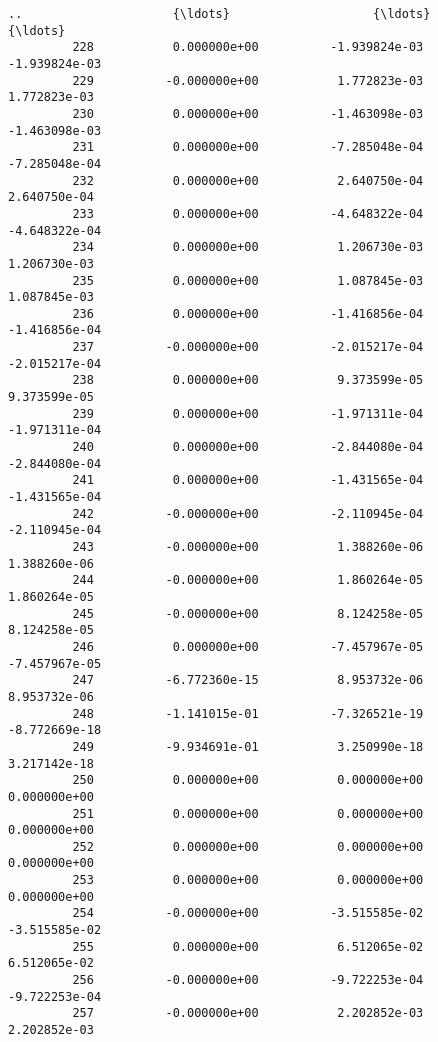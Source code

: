 \documentclass[11pt]{article}
\begin{document}
\begin{Verbatim}[commandchars=\\\{\}]
         ..                     {\ldots}                    {\ldots}                    {\ldots}   
         228           0.000000e+00          -1.939824e-03          -1.939824e-03   
         229          -0.000000e+00           1.772823e-03           1.772823e-03   
         230           0.000000e+00          -1.463098e-03          -1.463098e-03   
         231           0.000000e+00          -7.285048e-04          -7.285048e-04   
         232           0.000000e+00           2.640750e-04           2.640750e-04   
         233           0.000000e+00          -4.648322e-04          -4.648322e-04   
         234           0.000000e+00           1.206730e-03           1.206730e-03   
         235           0.000000e+00           1.087845e-03           1.087845e-03   
         236           0.000000e+00          -1.416856e-04          -1.416856e-04   
         237          -0.000000e+00          -2.015217e-04          -2.015217e-04   
         238           0.000000e+00           9.373599e-05           9.373599e-05   
         239           0.000000e+00          -1.971311e-04          -1.971311e-04   
         240           0.000000e+00          -2.844080e-04          -2.844080e-04   
         241           0.000000e+00          -1.431565e-04          -1.431565e-04   
         242          -0.000000e+00          -2.110945e-04          -2.110945e-04   
         243          -0.000000e+00           1.388260e-06           1.388260e-06   
         244          -0.000000e+00           1.860264e-05           1.860264e-05   
         245          -0.000000e+00           8.124258e-05           8.124258e-05   
         246           0.000000e+00          -7.457967e-05          -7.457967e-05   
         247          -6.772360e-15           8.953732e-06           8.953732e-06   
         248          -1.141015e-01          -7.326521e-19          -8.772669e-18   
         249          -9.934691e-01           3.250990e-18           3.217142e-18   
         250           0.000000e+00           0.000000e+00           0.000000e+00   
         251           0.000000e+00           0.000000e+00           0.000000e+00   
         252           0.000000e+00           0.000000e+00           0.000000e+00   
         253           0.000000e+00           0.000000e+00           0.000000e+00   
         254          -0.000000e+00          -3.515585e-02          -3.515585e-02   
         255           0.000000e+00           6.512065e-02           6.512065e-02   
         256          -0.000000e+00          -9.722253e-04          -9.722253e-04   
         257          -0.000000e+00           2.202852e-03           2.202852e-03   
         

\end{Verbatim}
\end{document}
